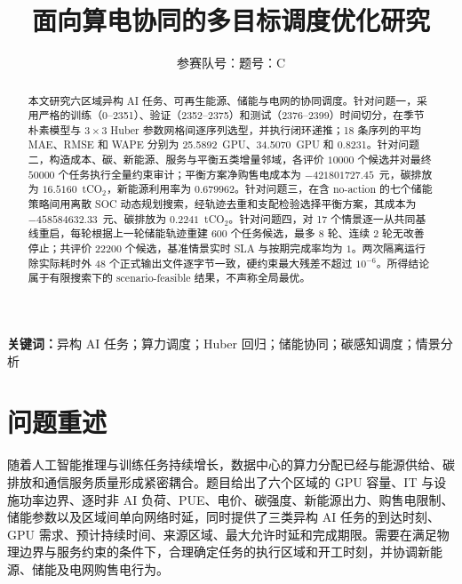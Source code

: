 \documentclass[withoutpreface,bwprint]{cumcmthesis}
\title{面向算电协同的多目标调度优化研究}
\author{参赛队号：\quad 题号：C}
\date{}
\begin{document}
\maketitle

\begin{abstract}
本文研究六区域异构 AI 任务、可再生能源、储能与电网的协同调度。针对问题一，采用严格的训练（0--2351）、验证（2352--2375）和测试（2376--2399）时间切分，在季节朴素模型与 $3\times3$ Huber 参数网格间逐序列选型，并执行闭环递推；18 条序列的平均 MAE、RMSE 和 WAPE 分别为 25.5892~GPU、34.5070~GPU 和 0.8231。针对问题二，构造成本、碳、新能源、服务与平衡五类增量邻域，各评价 $10000$ 个候选并对最终 $50000$ 个任务执行全量约束审计；平衡方案净购售电成本为 $-421801727.45$~元，碳排放为 $16.5160$~tCO$_2$，新能源利用率为 $0.679962$。针对问题三，在含 no-action 的七个储能策略间用离散 SOC 动态规划搜索，经轨迹去重和支配检验选择平衡方案，其成本为 $-458584632.33$~元、碳排放为 $0.2241$~tCO$_2$。针对问题四，对 17 个情景逐一从共同基线重启，每轮根据上一轮储能轨迹重建 600 个任务候选，最多 8 轮、连续 2 轮无改善停止；共评价 $22200$ 个候选，基准情景实时 SLA 与按期完成率均为 $1$。两次隔离运行除实际耗时外 48 个正式输出文件逐字节一致，硬约束最大残差不超过 $10^{-6}$。所得结论属于有限搜索下的 scenario-feasible 结果，不声称全局最优。
\end{abstract}

\noindent\textbf{关键词：}异构 AI 任务；算力调度；Huber 回归；储能协同；碳感知调度；情景分析

\clearpage

\small
\linespread{0.94}\selectfont
\setlength{\parskip}{0pt}
\setlength{\emergencystretch}{3em}
\setlength{\abovedisplayskip}{4pt plus 1pt minus 1pt}
\setlength{\belowdisplayskip}{4pt plus 1pt minus 1pt}
\setlength{\abovedisplayshortskip}{3pt plus 1pt minus 1pt}
\setlength{\belowdisplayshortskip}{3pt plus 1pt minus 1pt}
\setlength{\textfloatsep}{8pt plus 2pt minus 2pt}
\setlength{\floatsep}{7pt plus 2pt minus 2pt}
\setlength{\intextsep}{7pt plus 2pt minus 2pt}
\setlength{\abovecaptionskip}{3pt}
\setlength{\belowcaptionskip}{2pt}

\section{问题重述}

随着人工智能推理与训练任务持续增长，数据中心的算力分配已经与能源供给、碳排放和通信服务质量形成紧密耦合。题目给出了六个区域的 GPU 容量、IT 与设施功率边界、逐时非 AI 负荷、PUE、电价、碳强度、新能源出力、购售电限制、储能参数以及区域间单向网络时延，同时提供了三类异构 AI 任务的到达时刻、GPU 需求、预计持续时间、来源区域、最大允许时延和完成期限。需要在满足物理边界与服务约束的条件下，合理确定任务的执行区域和开工时刻，并协调新能源、储能及电网购售电行为。
\end{document}

